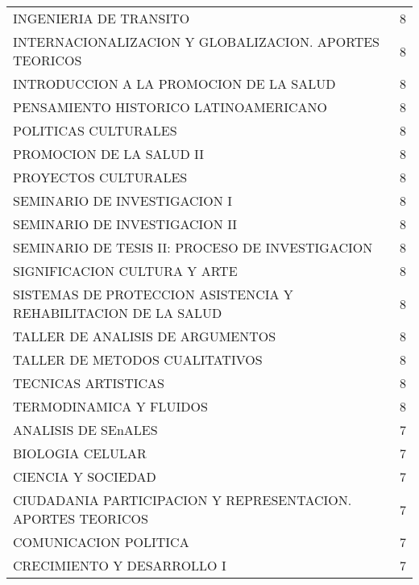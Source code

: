 \documentclass[12pt]{article}
\begin{document}
\begin{table}[ht]
{\begin{tabular}{lr}
  INGENIERIA DE TRANSITO & 8 \\ 
  INTERNACIONALIZACION Y GLOBALIZACION. APORTES TEORICOS & 8 \\ 
  INTRODUCCION A LA PROMOCION DE LA SALUD & 8 \\ 
  PENSAMIENTO HISTORICO LATINOAMERICANO & 8 \\ 
  POLITICAS CULTURALES & 8 \\ 
  PROMOCION DE LA SALUD II & 8 \\ 
  PROYECTOS CULTURALES & 8 \\ 
  SEMINARIO DE INVESTIGACION I & 8 \\ 
  SEMINARIO DE INVESTIGACION II & 8 \\ 
  SEMINARIO DE TESIS II: PROCESO DE INVESTIGACION & 8 \\ 
  SIGNIFICACION CULTURA Y ARTE & 8 \\ 
  SISTEMAS DE PROTECCION ASISTENCIA Y REHABILITACION DE LA SALUD & 8 \\ 
  TALLER DE ANALISIS DE ARGUMENTOS & 8 \\ 
  TALLER DE METODOS CUALITATIVOS & 8 \\ 
  TECNICAS ARTISTICAS & 8 \\ 
  TERMODINAMICA Y FLUIDOS & 8 \\ 
  ANALISIS DE SEnALES & 7 \\ 
  BIOLOGIA CELULAR & 7 \\ 
  CIENCIA Y SOCIEDAD & 7 \\ 
  CIUDADANIA PARTICIPACION Y REPRESENTACION. APORTES TEORICOS & 7 \\ 
  COMUNICACION POLITICA & 7 \\ 
  CRECIMIENTO Y DESARROLLO I & 7 \\ 
    \hline
\end{tabular}}
\end{table}
\end{document}
